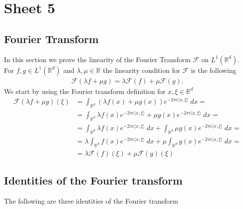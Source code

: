


\maketitle
\tableofcontents

\section{Sheet 5}
\subsection{Fourier Transform}
In this section we prove the linearity of the Fourier Transform $\mathcal{F}$ on
$L^1(\mathbb{R}^d)$. For $f, g \in L^1(\mathbb{R}^d)$ and $\lambda, \mu \in
\mathbb{R}$ the linearity condition for $\mathcal{F}$ is the following
\begin{align}
    \mathcal{F}(\lambda f + \mu g) = \lambda \mathcal{F}(f) + \mu
    \mathcal{F}(g).
\end{align}
We start by using the Fourier transform definition for $x, \xi \in \mathbb{R}^d$
\begin{align}
    \mathcal{F}(\lambda f + \mu g)(\xi) &= \int_{\mathbb{R}^d} (\lambda f(x)+
    \mu g(x)) e^{-2\pi i \langle x, \xi\rangle}\ dx =\\
    &= \int_{\mathbb{R}^d} \lambda f(x) e^{-2\pi i\langle x,\xi\rangle} + \mu
    g(x) e^{-2\pi i\langle x,\xi\rangle}\ dx =\\
    &= \int_{\mathbb{R}^d} \lambda f(x) e^{-2\pi i\langle x,\xi\rangle}\ dx+
    \int_{\mathbb{R}^d} \mu
    g(x) e^{-2\pi i\langle x,\xi\rangle}\ dx =\\
    &= \lambda \int_{\mathbb{R}^d} f(x) e^{-2\pi i\langle x,\xi\rangle}\ dx+
    \mu \int_{\mathbb{R}^d}
    g(x) e^{-2\pi i\langle x,\xi\rangle}\ dx =\\
    &= \lambda \mathcal{F}(f)(\xi) + \mu \mathcal{F}(g)(\xi)
\end{align}
\subsection{Identities of the Fourier transform}
The following are three identities of the Fourier transform

